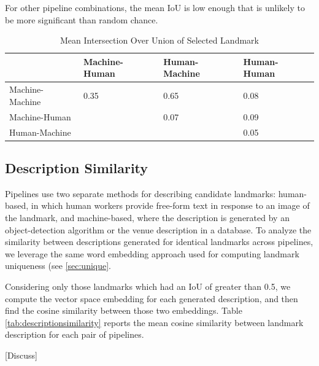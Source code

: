 For other pipeline combinations, the mean IoU is low enough that is unlikely to be more significant than random chance. 

\begin{table}[htbp]
  \centering
  \caption{Mean Intersection Over Union of Selected Landmark}
  \label{tab:iou}
  {\tabulinesep=2mm
    \begin{singlespace}
    \begin{tabu} to \textwidth{|X[c]||X[c]|X[c]|X[c]|}
    \hline
                & Machine-Human & Human-Machine & Human-Human \\
                \hline\hline
Machine-Machine   & 0.35        & 0.65          & 0.08          \\
\hline
Machine-Human &             & 0.07          & 0.09          \\
\hline
Human-Machine   &             &               & 0.05 
\\
    \hline
    \end{tabu}
    \end{singlespace}
    }
\end{table}

\subsection{Description Similarity}

Pipelines use two separate methods for describing candidate landmarks: human-based, in which human workers provide free-form text in response to an image of the landmark, and machine-based, where the description is generated by an object-detection algorithm or the venue description in a database. To analyze the similarity between descriptions generated for identical landmarks across pipelines, we leverage the same word embedding approach used for computing landmark uniqueness (see \ref{sec:unique}. 

Considering only those landmarks which had an IoU of greater than 0.5, we compute the vector space embedding for each generated description, and then find the cosine similarity between those two embeddings. Table \ref{tab:descriptionsimilarity} reports the mean cosine similarity between landmark description for each pair of pipelines.

[Discuss]

